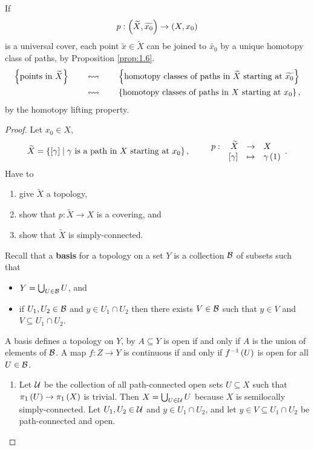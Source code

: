 \begin{remark*}
If
$$ p : \left( \widetilde{X}, \widetilde{x_0} \right) \to \left( X, x_0 \right) $$
is a universal cover, each point $ \widetilde{x} \in \widetilde{X} $ can be joined to $ \widetilde{x_0} $ by a unique homotopy class of paths, by Proposition \ref{prop:1.6}.
\begin{align*}
\left\{ \text{points in} \ \widetilde{X} \right\} \qquad
& \leftrightsquigarrow \qquad \left\{ \text{homotopy classes of paths in} \ \widetilde{X} \ \text{starting at} \ \widetilde{x_0} \right\} \\
& \leftrightsquigarrow \qquad \left\{ \text{homotopy classes of paths in} \ X \ \text{starting at} \ x_0 \right\},
\end{align*}
by the homotopy lifting property.
\end{remark*}

\begin{proof}
Let $ x_0 \in X $,
$$ \widetilde{X} = \cb{\sb{\gamma} \mid \gamma \ \text{is a path in} \ X \ \text{starting at} \ x_0}, \qquad \function[p]{\widetilde{X}}{X}{\sb{\gamma}}{\gamma\rb{1}}. $$
Have to
\begin{enumerate}
\item give $ \widetilde{X} $ a topology,
\item show that $ p : \widetilde{X} \to X $ is a covering, and
\item show that $ \widetilde{X} $ is simply-connected.
\end{enumerate}
Recall that a \textbf{basis} for a topology on a set $ Y $ is a collection $ \mathcal{B} $ of subsets such that
\begin{itemize}
\item $ Y = \bigcup_{U \in \mathcal{B}} U $, and
\item if $ U_1, U_2 \in \mathcal{B} $ and $ y \in U_1 \cap U_2 $ then there exists $ V \in \mathcal{B} $ such that $ y \in V $ and $ V \subseteq U_1 \cap U_2 $.
\end{itemize}
A basis defines a topology on $ Y $, by $ A \subseteq Y $ is open if and only if $ A $ is the union of elements of $ \mathcal{B} $. A map $ f : Z \to Y $ is continuous if and only if $ f^{-1}\left( U \right) $ is open for all $ U \in \mathcal{B} $.
\begin{enumerate}
\item Let $ \mathcal{U} $ be the collection of all path-connected open sets $ U \subseteq X $ such that $ \pi_1\left( U \right) \to \pi_1\left( X \right) $ is trivial. Then $ X = \bigcup_{U \in \mathcal{U}} U $ because $ X $ is semilocally simply-connected. Let $ U_1, U_2 \in \mathcal{U} $ and $ y \in U_1 \cap U_2 $, and let $ y \in V \subseteq U_1 \cap U_2 $ be path-connected and open.

\end{enumerate}
\end{proof}
